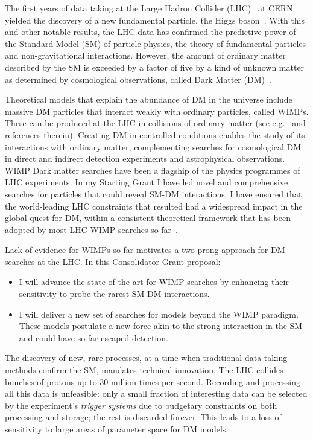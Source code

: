 \documentclass[11pt,a4paper]{article}
\begin{document}
The first years of data taking at the Large Hadron Collider (LHC)~\cite{LHC2008} at CERN yielded the discovery of a new fundamental particle, the Higgs boson~\cite{Khachatryan:2016vau}. With this and other notable results, the LHC data has confirmed the predictive power of the Standard Model (SM) of particle physics, the theory of fundamental particles and non-gravitational interactions. However, the amount of ordinary matter described by the SM is exceeded by a factor of five by a kind of unknown matter as determined by cosmological observations, called Dark Matter (DM)~\cite{Bertone:2016nfn}. 


Theoretical models that explain the abundance of DM in the universe include massive DM particles that interact weakly with ordinary particles, called WIMPs. These can be produced at the LHC in collisions of ordinary matter (see e.g.~\cite{Boveia:2018yeb} and references therein). 
Creating DM in controlled conditions enables the study of its interactions with ordinary matter, complementing searches for cosmological DM in direct and indirect detection experiments and astrophysical observations. %
WIMP Dark matter searches have been a flagship of the physics programmes of LHC experiments. In my Starting Grant I have led novel and comprehensive searches for particles that could reveal SM-DM interactions. I have ensured that the world-leading LHC constraints that resulted had a widespread impact in the global quest for DM, within a consistent theoretical framework that has been adopted by most LHC WIMP searches so far~\cite{DMWG}.  

Lack of evidence for WIMPs so far motivates a two-prong approach for DM searches at the LHC. In this Consolidator Grant proposal:
\begin{itemize}
    \item I will advance the state of the art for WIMP searches by enhancing their sensitivity to probe the rarest SM-DM interactions.
    \item I will deliver a new set of searches for models beyond the WIMP paradigm. These models postulate a new force akin to the strong interaction in the SM and could have so far escaped detection. 
\end{itemize}

The discovery of new, rare processes, at a time when traditional data-taking methods confirm the SM, mandates technical innovation. The LHC collides bunches of protons up to 30 million times per second. Recording and processing all this data is unfeasible: only a small fraction of interesting data can be selected by the experiment’s \textit{trigger systems} due to budgetary constraints on both processing and storage; the rest is discarded forever. This leads to a loss of sensitivity to large areas of parameter space for DM models. 
\end{document}
